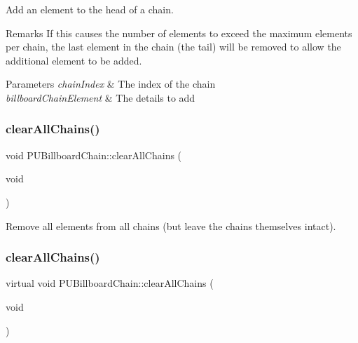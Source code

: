 Add an element to the \textquotesingle{}head\textquotesingle{} of a chain. \begin{DoxyRemark}{Remarks}
If this causes the number of elements to exceed the maximum elements per chain, the last element in the chain (the \textquotesingle{}tail\textquotesingle{}) will be removed to allow the additional element to be added. 
\end{DoxyRemark}

\begin{DoxyParams}{Parameters}
{\em chain\+Index} & The index of the chain \\
\hline
{\em billboard\+Chain\+Element} & The details to add \\
\hline
\end{DoxyParams}
\mbox{\label{classPUBillboardChain_a19068a669deb9dbbca4bfe08ddd76073}} 
\subsubsection{\texorpdfstring{clear\+All\+Chains()}{clearAllChains()}\hspace{0.1cm}{\footnotesize\ttfamily [1/2]}}
{\footnotesize\ttfamily void P\+U\+Billboard\+Chain\+::clear\+All\+Chains (\begin{DoxyParamCaption}\item[{void}]{ }\end{DoxyParamCaption})\hspace{0.3cm}{\ttfamily [virtual]}}

Remove all elements from all chains (but leave the chains themselves intact). \mbox{\label{classPUBillboardChain_a1d54a310061c1d3158b672e618fa49b5}} 
\subsubsection{\texorpdfstring{clear\+All\+Chains()}{clearAllChains()}\hspace{0.1cm}{\footnotesize\ttfamily [2/2]}}
{\footnotesize\ttfamily virtual void P\+U\+Billboard\+Chain\+::clear\+All\+Chains (\begin{DoxyParamCaption}\item[{void}]{ }\end{DoxyParamCaption})\hspace{0.3cm}{\ttfamily [virtual]}}

